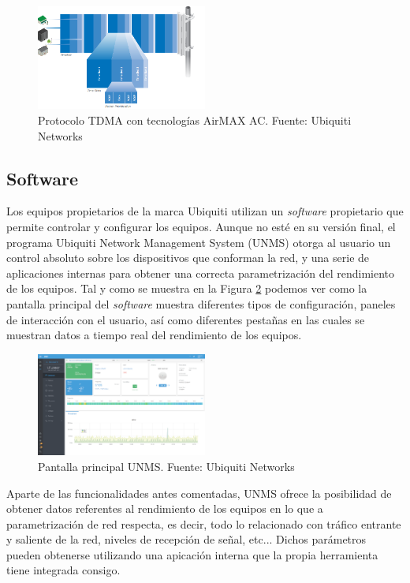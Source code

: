 \begin{figure}[H]
		\centering
		\includegraphics[width=0.5\textwidth]{img/tdma_ac.PNG}
		\caption{Protocolo TDMA con tecnologías AirMAX AC. Fuente: Ubiquiti Networks}
		\label{tdma_ac}
\end{figure}
	
\subsection{Software}
Los equipos propietarios de la marca Ubiquiti utilizan un \textit{software} propietario que permite controlar y configurar los equipos. Aunque no esté en su versión final, el programa Ubiquiti Network Management System (UNMS) otorga al usuario un control absoluto sobre los dispositivos que conforman la red, y una serie de aplicaciones internas para obtener una correcta parametrización del rendimiento de los equipos. Tal y como se muestra en la Figura \ref{unms} podemos ver como la pantalla principal del \textit{software} muestra diferentes tipos de configuración, paneles de interacción con el usuario, así como diferentes pestañas en las cuales se muestran datos a tiempo real del rendimiento de los equipos. 

\begin{figure}[H]
		\centering
		\includegraphics[width=0.5\textwidth]{img/unms.png}
		\caption{Pantalla principal UNMS. Fuente: Ubiquiti Networks}
		\label{unms}
	\end{figure}
	
Aparte de las funcionalidades antes comentadas, UNMS ofrece la posibilidad de obtener datos referentes al rendimiento de los equipos en lo que a parametrización de red respecta, es decir, todo lo relacionado con tráfico entrante y saliente de la red, niveles de recepción de señal, etc... Dichos parámetros pueden obtenerse utilizando una apicación interna que la propia herramienta tiene integrada consigo.

